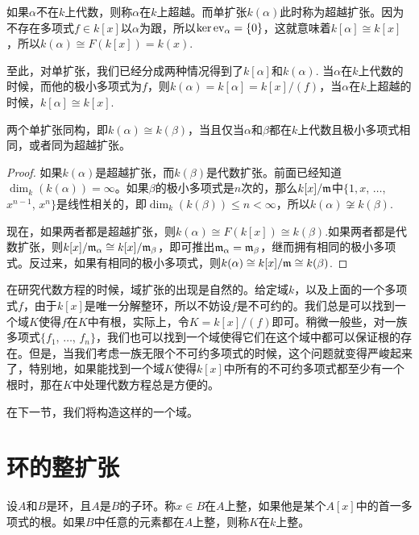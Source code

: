 \para 如果$\alpha$不在$k$上代数，则称$\alpha$在$k$上超越。而单扩张$k(\alpha)$此时称为超越扩张。因为不存在多项式$f\in k[x]$以$\alpha$为跟，所以$\ker \operatorname{ev}_\alpha=\{0\}$，这就意味着$k[\alpha]\cong k[x]$，所以$k(\alpha)\cong F(k[x])=k(x)$.

至此，对单扩张，我们已经分成两种情况得到了$k[\alpha]$和$k(\alpha)$. 当$\alpha$在$k$上代数的时候，而他的极小多项式为$f$，则$k(\alpha)=k[\alpha]=k[x]/(f)$，当$\alpha$在$k$上超越的时候，$k[\alpha]\cong k[x]$.

\begin{pro}
两个单扩张同构，即$k(\alpha)\cong k(\beta)$，当且仅当$\alpha$和$\beta$都在$k$上代数且极小多项式相同，或者同为超越扩张。
\end{pro}

\begin{proof} 
	如果$k(\alpha)$是超越扩张，而$k(\beta)$是代数扩张。前面已经知道$\dim_k(k(\alpha))=\infty$。如果$\beta$的极小多项式是$n$次的，那么$k[x]/\mathfrak{m}$中$\{1,x$, $\dots$, $x^{n-1}$, $x^n\}$是线性相关的，即$\dim_k(k(\beta))\leq n<\infty$，所以$k(\alpha)\not\cong k(\beta)$.

	现在，如果两者都是超越扩张，则$k(\alpha)\cong F(k[x])\cong k(\beta)$.如果两者都是代数扩张，则$k[x]/\mathfrak{m}_\alpha\cong k[x]/\mathfrak{m}_\beta$，即可推出$\mathfrak{m}_\alpha=\mathfrak{m}_\beta$，继而拥有相同的极小多项式。反过来，如果有相同的极小多项式，则$k(\alpha)\cong k[x]/\mathfrak{m}\cong k(\beta)$.
\end{proof}

\begin{para}
	在研究代数方程的时候，域扩张的出现是自然的。给定域$k$，以及上面的一个多项式$f$，由于$k[x]$是唯一分解整环，所以不妨设$f$是不可约的。我们总是可以找到一个域$K$使得$f$在$K$中有根，实际上，令$K=k[x]/(f)$即可。稍微一般些，对一族多项式$\{f_1$, $\dots$, $f_n\}$，我们也可以找到一个域使得它们在这个域中都可以保证根的存在。但是，当我们考虑一族无限个不可约多项式的时候，这个问题就变得严峻起来了，特别地，如果能找到一个域$K$使得$k[x]$中所有的不可约多项式都至少有一个根时，那在$K$中处理代数方程总是方便的。
\end{para}

在下一节，我们将构造这样的一个域。

\section{环的整扩张}

\para 设$A$和$B$是环，且$A$是$B$的子环。称$x\in B$在$A$上整，如果他是某个$A[x]$中的首一多项式的根。如果$B$中任意的元素都在$A$上整，则称$K$在$k$上整。

